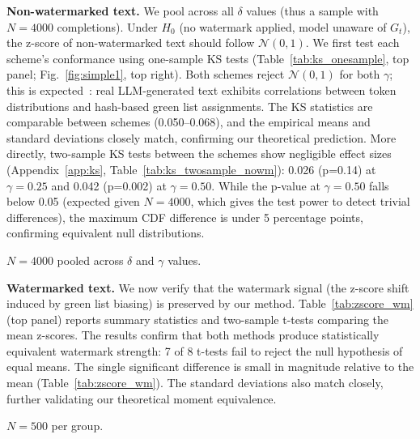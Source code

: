 \documentclass[11pt]{article}
\begin{document}
\textbf{Non-watermarked text.} We pool across all $\delta$ values (thus a sample with $N=4000$ completions). Under $H_0$ (no watermark applied, model unaware of $G_t$), the z-score of non-watermarked text should follow $\mathcal{N}(0,1)$. We first test each scheme's conformance using one-sample KS tests (Table~\ref{tab:ks_onesample}, top panel; Fig.~\ref{fig:simple1}, top right). Both schemes reject $\mathcal{N}(0,1)$ for both $\gamma$; this is expected~\cite{kirchenbauer2023watermark}: real LLM-generated text exhibits correlations between token distributions and hash-based green list assignments. The KS statistics are comparable between schemes (0.050--0.068), and the empirical means and standard deviations closely match, confirming our theoretical prediction. More directly, two-sample KS tests between the schemes show negligible effect sizes (Appendix~\ref{app:ks}, Table~\ref{tab:ks_twosample_nowm}): 0.026 (p=0.14) at $\gamma=0.25$ and 0.042 (p=0.002) at $\gamma=0.50$. While the p-value at $\gamma=0.50$ falls below 0.05 (expected given $N=4000$, which gives the test power to detect trivial differences), the maximum CDF difference is under 5 percentage points, confirming equivalent null distributions.

\begin{table}[!t]
\caption{One-Sample KS Tests vs $\mathcal{N}(0,1)$ (Non-Watermarked)}
\label{tab:ks_onesample}
\begin{center}
\footnotesize
\resizebox{\columnwidth}{!}{}
\end{center}
\vspace{-2mm}
{\small $N=4000$ pooled across $\delta$ and $\gamma$ values.}
\end{table}

\textbf{Watermarked text.} We now verify that the watermark signal (the z-score shift induced by green list biasing) is preserved by our method. Table~\ref{tab:zscore_wm} (top panel) reports summary statistics and two-sample t-tests comparing the mean z-scores. The results confirm that both methods produce statistically equivalent watermark strength: 7 of 8 t-tests fail to reject the null hypothesis of equal means. The single significant difference is small in magnitude relative to the mean (Table~\ref{tab:zscore_wm}). The standard deviations also match closely, further validating our theoretical moment equivalence.

\begin{table}[!t]
\caption{Watermarked Z-Score Statistics}
\label{tab:zscore_wm}
\begin{center}
\footnotesize
\resizebox{\columnwidth}{!}{}
\end{center}
\vspace{-2mm}
{\small $N=500$ per group.}
\end{table}
\end{document}
